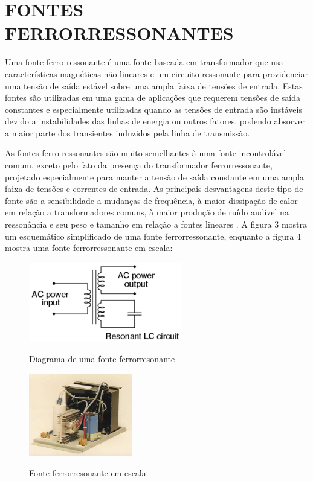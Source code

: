 \section{FONTES FERRORRESSONANTES}
\label{sec:fontFerro}

Uma fonte ferro-ressonante é uma fonte baseada em transformador que usa características magnéticas não lineares e um circuito ressonante para providenciar uma tensão de saída estável sobre uma ampla faixa de tensões de entrada. Estas fontes são utilizadas em uma gama de aplicações que requerem tensões de saída constantes e especialmente utilizadas quando as tensões de entrada são instáveis devido a instabilidades das linhas de energia ou outros fatores, podendo absorver a maior parte dos transientes induzidos pela linha de transmissão. 

As fontes ferro-ressonantes são muito semelhantes à uma fonte incontrolável comum, exceto pelo fato da presença do transformador ferrorressonante, projetado especialmente para manter a tensão de saída constante em uma ampla faixa de tensões e correntes de entrada.  As principais desvantagens deste tipo de fonte são a sensibilidade a mudanças de frequência, à maior dissipação de calor em relação a transformadores comuns, à maior produção de ruído audível na ressonância e seu peso e tamanho em relação a fontes lineares \cite{PowerUk}. A figura 3 mostra um esquemático simplificado de uma fonte ferrorressonante, enquanto a figura 4 mostra uma fonte ferrorressonante em escala:


\begin{figure}[!htb]
    \centering
    \caption{Diagrama de uma fonte ferrorresonante}
    \includegraphics[width=0.6\textwidth]{./dados/figuras/font-ferro}
    \label{fig:figura-fontferro}
\end{figure}

\pagebreak

\begin{figure}[!htb]
    \centering
    \caption{Fonte ferrorresonante em escala}
    \includegraphics[width=0.4\textwidth]{./dados/figuras/font-ferro-real}
    \label{fig:figura-fontferro}
\end{figure}



